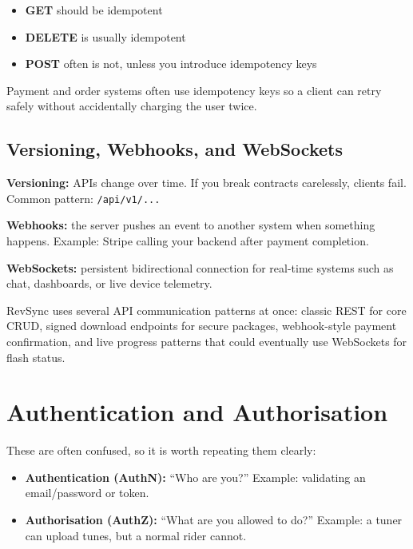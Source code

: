 \documentclass[12pt, a4paper, oneside]{book}
\begin{document}
\begin{itemize}[leftmargin=2em]
    \item \textbf{GET} should be idempotent
    \item \textbf{DELETE} is usually idempotent
    \item \textbf{POST} often is not, unless you introduce idempotency keys
\end{itemize}

\begin{notebox}
Payment and order systems often use idempotency keys so a client can retry safely without accidentally charging the user twice.
\end{notebox}

\subsection{Versioning, Webhooks, and WebSockets}

\textbf{Versioning:} APIs change over time. If you break contracts carelessly, clients fail. Common pattern: \texttt{/api/v1/...}

\textbf{Webhooks:} the server pushes an event to another system when something happens. Example: Stripe calling your backend after payment completion.

\textbf{WebSockets:} persistent bidirectional connection for real-time systems such as chat, dashboards, or live device telemetry.

\begin{projectbox}
RevSync uses several API communication patterns at once: classic REST for core CRUD, signed download endpoints for secure packages, webhook-style payment confirmation, and live progress patterns that could eventually use WebSockets for flash status.
\end{projectbox}

\section{Authentication and Authorisation}

These are often confused, so it is worth repeating them clearly:

\begin{itemize}[leftmargin=2em]
    \item \textbf{Authentication (AuthN):} ``Who are you?'' Example: validating an email/password or token.
    \item \textbf{Authorisation (AuthZ):} ``What are you allowed to do?'' Example: a tuner can upload tunes, but a normal rider cannot.
\end{itemize}
\end{document}
